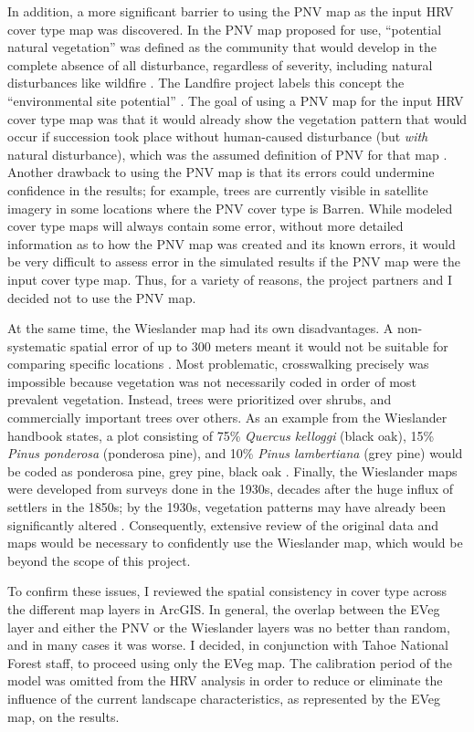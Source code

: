 In addition, a more significant barrier to using the PNV map as the input HRV cover type map was discovered. In the PNV map proposed for use, ``potential natural vegetation'' was defined as the community that would develop in the complete absence of all disturbance, regardless of severity, including natural disturbances like wildfire \citep{Fites1993}. The Landfire project labels this concept the ``environmental site potential'' \citep{Landfire2007}. The goal of using a PNV map for the input HRV cover type map was that it would already show the vegetation pattern that would occur if succession took place without human-caused disturbance (but \emph{with} natural disturbance), which was the assumed definition of PNV for that map \citep{Potter1998}. Another drawback to using the PNV map is that its errors could undermine confidence in the results; for example, trees are currently visible in satellite imagery in some locations where the PNV cover type is Barren. While modeled cover type maps will always contain some error, without more detailed information as to how the PNV map was created and its known errors, it would be very difficult to assess error in the simulated results if the PNV map were the input cover type map. Thus, for a variety of reasons, the project partners and I decided not to use the PNV map.

At the same time, the Wieslander map had its own disadvantages. A non-systematic spatial error of up to 300 meters meant it would not be suitable for comparing specific locations \citep{Thorne2006}. Most problematic, crosswalking precisely was impossible because vegetation was not necessarily coded in order of most prevalent vegetation. Instead, trees were prioritized over shrubs, and commercially important trees over others. As an example from the Wieslander handbook states, a plot consisting of 75\% \emph{Quercus kelloggi} (black oak), 15\% \emph{Pinus ponderosa} (ponderosa pine), and 10\% \emph{Pinus lambertiana} (grey pine) would be coded as ponderosa pine, grey pine, black oak \citep{Thorne2006}. Finally, the Wieslander maps were developed from surveys done in the 1930s, decades after the huge influx of settlers in the 1850s; by the 1930s, vegetation patterns may have already been significantly altered \citep{Thorne2006}. Consequently, extensive review of the original data and maps would be necessary to confidently use the Wieslander map, which would be beyond the scope of this project. 

To confirm these issues, I reviewed the spatial consistency in cover type across the different map layers in ArcGIS. In general, the overlap between the EVeg layer and either the PNV or the Wieslander layers was no better than random, and in many cases it was worse. I decided, in conjunction with Tahoe National Forest staff, to proceed using only the EVeg map. The calibration period of the model was omitted from the HRV analysis in order to reduce or eliminate the influence of the current landscape characteristics, as represented by the EVeg map, on the results.



